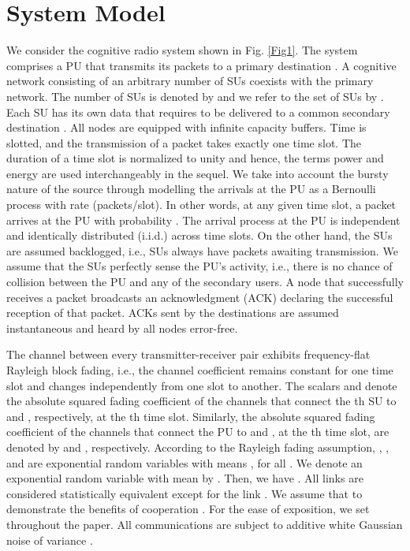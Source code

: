 \documentclass[journal,twocolumn]{IEEEtran}
\begin{document}
\section{System Model}\label{system_model}
We consider the cognitive radio system shown in Fig. \ref{Fig1}.
The system comprises a PU  that transmits its packets to a primary destination . A cognitive network consisting of an arbitrary number of SUs coexists with the primary network. The number of SUs is denoted by  and we refer to the set of SUs by . Each SU has its own data that requires to be delivered to a common secondary destination . All nodes are equipped with infinite capacity buffers. Time is slotted, and the transmission of a packet takes exactly one time slot. The duration of a time slot is normalized to unity and hence, the terms power and energy are used interchangeably in the sequel. We take into account the bursty nature of the source through modelling the arrivals at the PU as a Bernoulli process with rate  (packets/slot). In other words, at any given time slot, a packet
arrives at the PU with probability . The arrival process at the PU is independent and identically distributed (i.i.d.) across time slots. On the other hand, the SUs are assumed backlogged, i.e., SUs always have packets awaiting transmission. We assume that the SUs perfectly sense the PU's activity, i.e., there is no chance of collision between the PU and any of the secondary users. A node that successfully receives a packet broadcasts an acknowledgment (ACK) declaring the successful reception of that packet. ACKs sent by the destinations are assumed instantaneous and heard by all nodes error-free.

The channel between every transmitter-receiver pair exhibits frequency-flat Rayleigh block fading, i.e., the channel coefficient remains constant for one time slot and changes independently from one slot to another. The scalars  and  denote the absolute squared fading coefficient of the channels that connect the th SU to  and , respectively, at the th time slot. Similarly, the absolute squared fading coefficient of the channels that connect the PU to  and , at the th time slot, are denoted by  and , respectively. According to the Rayleigh fading assumption, , , and  are exponential random variables with means , for all . We denote an exponential random variable with mean  by . Then, we have . All links are considered statistically equivalent except for the link . We assume that  to demonstrate the benefits of cooperation \cite{sadek}. For the ease of exposition, we set  throughout the paper. All communications are subject to additive white Gaussian noise of variance .
\end{document}

